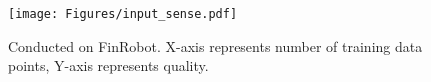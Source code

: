 {
\begin{figure}[h]
\centerline{\texttt{[image: Figures/input\_sense.pdf]}}
\vspace{-0.1in}
 {Conducted on FinRobot. X-axis represents number of training data points, Y-axis represents quality.}
\label{fig-input-sensitivity}
\end{figure}
}